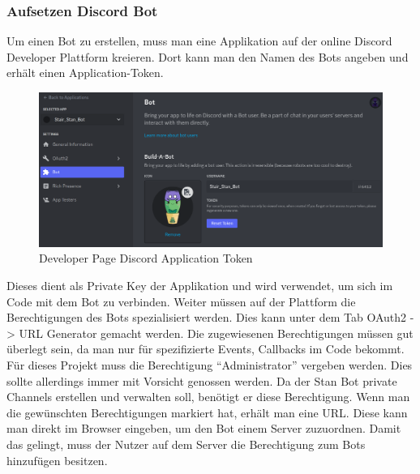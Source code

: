 \documentclass[a4paper, table]{article}
\begin{document}
\subsubsection{Aufsetzen Discord Bot}
Um einen Bot zu erstellen, muss man eine Applikation auf der online Discord Developer Plattform kreieren. 
Dort kann man den Namen des Bots angeben und erhält einen Application-Token.

\begin{figure}[h]
    \centering
    \includegraphics[width=1\textwidth]{img/discord_developer_bot.png}
    \caption{Developer Page Discord Application Token}
    \label{fig:delevoper-application-token}
\end{figure}
Dieses dient als Private Key der Applikation und wird verwendet, um sich im Code mit dem Bot zu verbinden. 
Weiter müssen auf der Plattform die Berechtigungen des Bots spezialisiert werden. 
Dies kann unter dem Tab OAuth2 -> \gls{URL} Generator gemacht werden. 
Die zugewiesenen Berechtigungen müssen gut überlegt sein, da man nur für spezifizierte Events, Callbacks im Code bekommt.
Für dieses Projekt muss die Berechtigung “Administrator” vergeben werden. 
Dies sollte allerdings immer mit Vorsicht genossen werden. 
Da der Stan Bot private Channels erstellen und verwalten soll, benötigt er diese Berechtigung. 
Wenn man die gewünschten Berechtigungen markiert hat, erhält man eine URL. 
Diese kann man direkt im Browser eingeben, um den Bot einem Server zuzuordnen. 
Damit das gelingt, muss der Nutzer auf dem Server die Berechtigung zum Bots hinzufügen besitzen.
\end{document}
